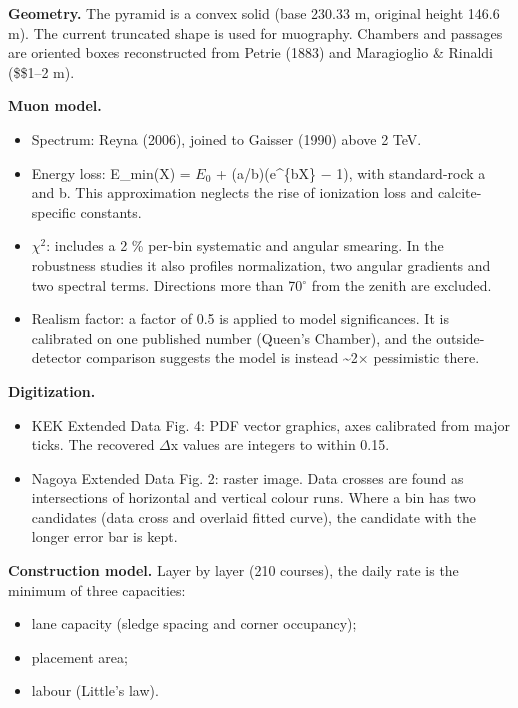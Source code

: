 \documentclass[
  11pt,
]{article}
\providecommand{\tightlist}{%
  \setlength{\itemsep}{0pt}\setlength{\parskip}{0pt}}
\begin{document}
\textbf{Geometry.} The pyramid is a convex solid (base 230.33 m,
original height 146.6 m). The current truncated shape is used for
muography. Chambers and passages are oriented boxes reconstructed from
Petrie (1883) and Maragioglio \& Rinaldi (\$\pm\$1--2 m).

\textbf{Muon model.}

\begin{itemize}
\tightlist
\item
  Spectrum: Reyna (2006), joined to Gaisser (1990) above 2 TeV.
\item
  Energy loss: E\_min(X) = \(E_0\) + (a/b)(e\^{}\{bX\} − 1), with
  standard-rock a and b. This approximation neglects the rise of
  ionization loss and calcite-specific constants.
\item
  \(\chi^{2}\): includes a 2 \% per-bin systematic and angular smearing.
  In the robustness studies it also profiles normalization, two angular
  gradients and two spectral terms. Directions more than 70\(^\circ\)
  from the zenith are excluded.
\item
  Realism factor: a factor of 0.5 is applied to model significances. It
  is calibrated on one published number (Queen's Chamber), and the
  outside-detector comparison suggests the model is instead
  \textasciitilde2\(\times\) pessimistic there.
\end{itemize}

\textbf{Digitization.}

\begin{itemize}
\tightlist
\item
  KEK Extended Data Fig. 4: PDF vector graphics, axes calibrated from
  major ticks. The recovered \(\Delta\)x values are integers to within
  0.15.
\item
  Nagoya Extended Data Fig. 2: raster image. Data crosses are found as
  intersections of horizontal and vertical colour runs. Where a bin has
  two candidates (data cross and overlaid fitted curve), the candidate
  with the longer error bar is kept.
\end{itemize}

\textbf{Construction model.} Layer by layer (210 courses), the daily
rate is the minimum of three capacities:

\begin{itemize}
\tightlist
\item
  lane capacity (sledge spacing and corner occupancy);
\item
  placement area;
\item
  labour (Little's law).
\end{itemize}
\end{document}
